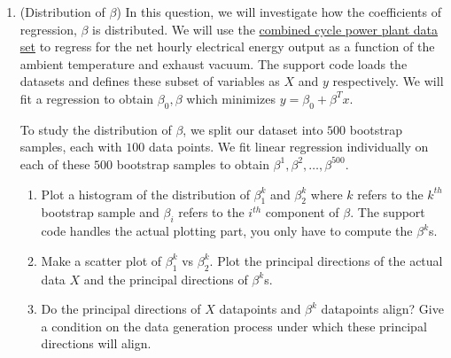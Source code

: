 \documentclass[12pt,twoside]{article}
\begin{document}
\begin{enumerate}
\begin{enumerate}
  \end{enumerate}   

 \newpage
   
\item (Distribution of $\beta$)  In this question, we will investigate how the coefficients of regression, $\beta$ is distributed. We will use the \href{https://archive.ics.uci.edu/ml/datasets/Combined+Cycle+Power+Plant}{combined cycle power plant data set} to regress for the net hourly electrical energy output as a function of the ambient temperature and exhaust vacuum. The support code loads the datasets and defines these subset of variables as $X$ and $y$ respectively. We will fit a regression to obtain $\beta_0, \beta$ which minimizes $y = \beta_0 + \beta^Tx$. 

To study the distribution of $\beta$, we split our dataset into $500$ bootstrap samples, each with $100$ data points. We fit linear regression individually on each of these $500$ bootstrap samples to obtain $\beta^1, \beta^2, \dots, \beta^{500}$.
\begin{enumerate}
\item Plot a histogram of the distribution of $\beta_1^k$ and $\beta_2^k$ where $k$ refers to the $k^{th}$ bootstrap sample and $\beta_i$ refers to the $i^{th}$ component of $\beta$.  The support code handles the actual plotting part, you only have to compute the $\beta^k$s. 
\item Make a scatter plot of $\beta_1^k$ vs $\beta_2^k$. Plot the principal directions of the actual data $X$ and the principal directions of $\beta^k$s. 
\item Do the principal directions of $X$ datapoints and $\beta^k$ datapoints align? Give a condition on the data generation process under which these principal directions will align. 
\end{enumerate}
\end{enumerate}
\end{document}
